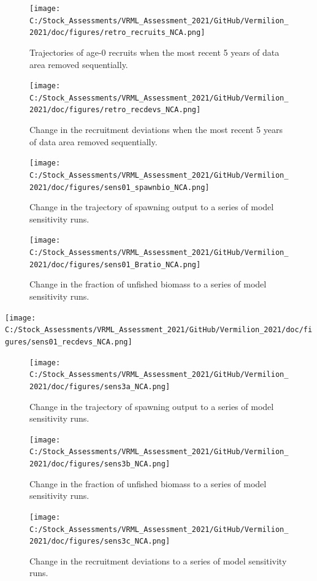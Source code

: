 \documentclass[
  english,
  a4paper,
]{article}
\begin{document}
\begin{figure}
\centering
\texttt{[image: C:/Stock\_Assessments/VRML\_Assessment\_2021/GitHub/Vermilion\_2021/doc/figures/retro\_recruits\_NCA.png]}
\caption{Trajectories of age-0 recruits when the most recent 5 years of data area removed sequentially.\label{fig:retro-recruits}}
\end{figure}

\begin{figure}
\centering
\texttt{[image: C:/Stock\_Assessments/VRML\_Assessment\_2021/GitHub/Vermilion\_2021/doc/figures/retro\_recdevs\_NCA.png]}
\caption{Change in the recruitment deviations when the most recent 5 years of data area removed sequentially.\label{fig:retro-recdevs}}
\end{figure}

\begin{figure}
\centering
\texttt{[image: C:/Stock\_Assessments/VRML\_Assessment\_2021/GitHub/Vermilion\_2021/doc/figures/sens01\_spawnbio\_NCA.png]}
\caption{Change in the trajectory of spawning output to a series of model sensitivity runs.\label{fig:sens1-spawnb}}
\end{figure}

\begin{figure}
\centering
\texttt{[image: C:/Stock\_Assessments/VRML\_Assessment\_2021/GitHub/Vermilion\_2021/doc/figures/sens01\_Bratio\_NCA.png]}
\caption{Change in the fraction of unfished biomass to a series of model sensitivity runs.\label{fig:sens1-bratio}}
\end{figure}

\texttt{[image: C:/Stock\_Assessments/VRML\_Assessment\_2021/GitHub/Vermilion\_2021/doc/figures/sens01\_recdevs\_NCA.png]}

\begin{figure}
\centering
\texttt{[image: C:/Stock\_Assessments/VRML\_Assessment\_2021/GitHub/Vermilion\_2021/doc/figures/sens3a\_NCA.png]}
\caption{Change in the trajectory of spawning output to a series of model sensitivity runs.\label{fig:sens3a}}
\end{figure}

\begin{figure}
\centering
\texttt{[image: C:/Stock\_Assessments/VRML\_Assessment\_2021/GitHub/Vermilion\_2021/doc/figures/sens3b\_NCA.png]}
\caption{Change in the fraction of unfished biomass to a series of model sensitivity runs.\label{fig:sens3b}}
\end{figure}

\begin{figure}
\centering
\texttt{[image: C:/Stock\_Assessments/VRML\_Assessment\_2021/GitHub/Vermilion\_2021/doc/figures/sens3c\_NCA.png]}
\caption{Change in the recruitment deviations to a series of model sensitivity runs.\label{fig:sens3c}}
\end{figure}
\end{document}
